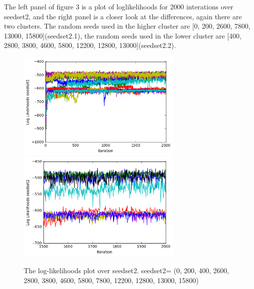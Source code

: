 \documentclass[11pt]{article}
\begin{document}
\begin{spacing}{1.6}
\noindent The left panel of figure 3 is a plot of loglikelihoods for 2000 interations over seedset2, and the right panel is a closer look at the differences, again there are two clusters. The random seeds used in the higher cluster are [0, 200, 2600, 7800, 13000, 15800](seedset2.1), the random seeds used in the lower cluster are [400, 2800, 3800, 4600, 5800, 12200, 12800, 13000](seedset2.2).\\
\begin{minipage}{1.0\textwidth}
\begin{figure}[H]
\includegraphics[width = 80mm]{figure3.png}
\includegraphics[width = 80mm]{figure4.png}
\caption{The log-likelihoods plot over seedset2.  seedset2= (0, 200, 400, 2600, 2800, 3800, 4600, 5800, 7800, 12200, 12800, 13000, 15800)}\scriptsize
\end{figure}
\end{minipage}\\


\end{spacing}
\end{document}
